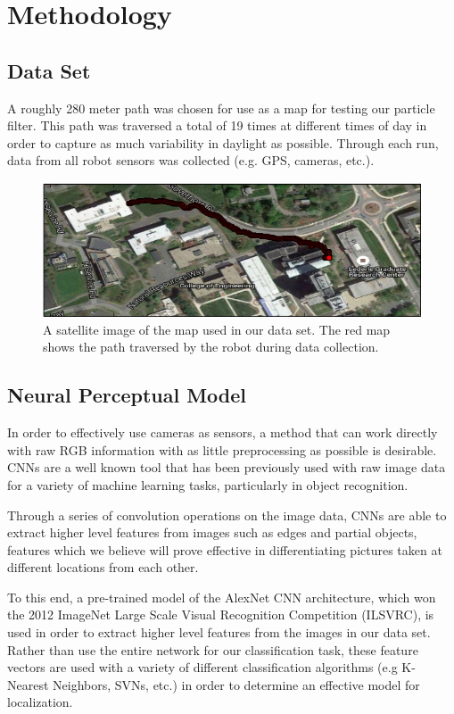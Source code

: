 \documentclass[letterpaper, 12 pt, conference]{ieeeconf}  %
\begin{document}
\section{Methodology}

\subsection{Data Set}
A roughly 280 meter path was chosen for use as a map for testing our particle filter. This path was traversed a total of 19 times at different times of day in order to capture as much variability in daylight as possible. Through each run, data from all robot sensors was collected (e.g. GPS, cameras, etc.).  

\begin{figure}[h]
\centering
\includegraphics[scale=0.5]{map}
\caption{A satellite image of the map used in our data set. The red map shows the path traversed by the robot during data collection.}
\end{figure}

\subsection{Neural Perceptual Model}
In order to effectively use cameras as sensors, a method that can work directly with raw RGB information with as little preprocessing as possible is desirable. CNNs are a well known tool that has been previously used with raw image data for a variety of machine learning tasks, particularly in object recognition. 
\par
Through a series of convolution operations on the image data, CNNs are able to extract higher level features from images such as edges and partial objects, features which we believe will prove effective in differentiating pictures taken at different locations from each other. 
\par
To this end, a pre-trained model of the AlexNet CNN architecture, which won the 2012 ImageNet Large Scale Visual Recognition Competition (ILSVRC), is used in order to extract higher level features from the images in our data set. Rather than use the entire network for our classification task, these feature vectors are used with a variety of different classification algorithms (e.g K-Nearest Neighbors, SVNs, etc.) in order to determine an effective model for localization.  
\end{document}
